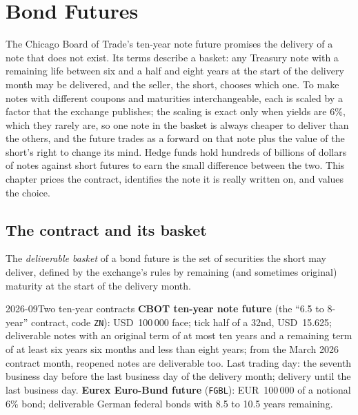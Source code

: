 \chapter{Bond Futures}\label{ch:m2:bond-futures}

The Chicago Board of Trade's ten-year note future promises the delivery of a
note that does not exist. Its terms
describe a basket: any Treasury note with a remaining life between six and a
half and eight years at the start of the delivery month may be delivered, and
the seller, the short, chooses which one. To make notes with different
coupons and maturities interchangeable, each is scaled by a factor that
the exchange publishes; the scaling is exact only when yields are 6\%, which
they rarely are, so one note in the basket is always cheaper to deliver than
the others, and the future trades as a forward on that note plus the value of
the short's right to change its mind. Hedge funds hold hundreds of billions of
dollars of notes against short futures to earn the small difference between
the two. This chapter prices the contract, identifies the note it is really
written on, and values the choice.

\section{The contract and its basket}

\begin{definition}\label{def:m2:bond-futures:basket}
The \emph{deliverable basket} of a bond future is
the set of securities the short may deliver, defined by the exchange's rules
by remaining (and sometimes original) maturity at the start of the delivery
month.
\end{definition}

\begin{dated}{2026-09}{Two ten-year contracts}\label{dat:m2:bond-futures:contracts}
\textbf{CBOT ten-year note future} (the ``6.5 to 8-year'' contract,
code \texttt{ZN}): USD~100\,000 face; tick half of a 32nd, USD~15.625; deliverable
notes with an original term of at most ten years and a remaining term of at
least six years six months and less than eight years; from the March 2026
contract month, reopened notes are deliverable too. Last trading day: the
seventh business day before the last business day of the delivery month;
delivery until the last business day. \textbf{Eurex Euro-Bund future}
(\texttt{FGBL}): EUR~100\,000 of a notional 6\% bond; deliverable German federal
bonds with 8.5 to 10.5 years remaining.
\end{dated}

